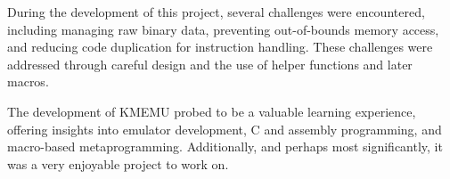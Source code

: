 \documentclass[12pt,a4paper,final]{article}
\begin{document}
During the development of this project, several challenges were encountered,
including managing raw binary data, preventing out-of-bounds memory access, and
reducing code duplication for instruction handling. These challenges were
addressed through careful design and the use of helper functions and later
macros.

The development of KMEMU probed to be a valuable learning experience, offering
insights into emulator development, C and assembly programming, and macro-based
metaprogramming. Additionally, and perhaps most significantly, it was a very
enjoyable project to work on.
\end{document}
